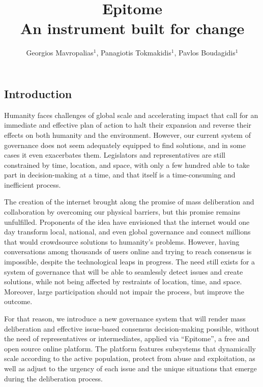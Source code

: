 \documentclass[a4paper,11pt]{article}
\title{%
    \textbf{\titlefont Epitome} \\
        \large  An instrument built for change}
\author{Georgios Mavropalias$^{1}$, Panagiotis Tokmakidis$^{1}$, Pavlos Boudagidis$^{1}$}
\date{}
\begin{document}

\maketitle

\begin{multicols}{2}

\section{Introduction} \label{introduction}

Humanity faces challenges of global scale and accelerating impact that call for an immediate and effective plan of action to halt their expansion and reverse their effects on both humanity and the environment. However, our current system of governance does not seem adequately equipped to find solutions, and in some cases it even exacerbates them. Legislators and representatives are still constrained by time, location, and space, with only a few hundred able to take part in decision-making at a time, and that itself is a time-consuming and inefficient process.

The creation of the internet brought along the promise of mass deliberation and collaboration by overcoming our physical barriers, but this promise remains unfulfilled. Proponents of the idea have envisioned that the internet would one day transform local, national, and even global governance and connect millions that would crowdsource solutions to humanity's problems. However, having conversations among thousands of users online and trying to reach consensus is impossible, despite the technological leaps in progress. The need still exists for a system of governance that will be able to seamlessly detect issues and create solutions, while not being affected by restraints of location, time, and space. Moreover, large participation should not impair the process, but improve the outcome.

For that reason, we introduce a new governance system that will render mass deliberation and effective issue-based consensus decision-making possible, without the need of representatives or intermediates, applied via ``Epitome'', a free and open source online platform. The platform features subsystems that dynamically scale according to the active population, protect from abuse and exploitation, as well as adjust to the urgency of each issue and the unique situations that emerge during the deliberation process.


\end{multicols}
\end{document}
